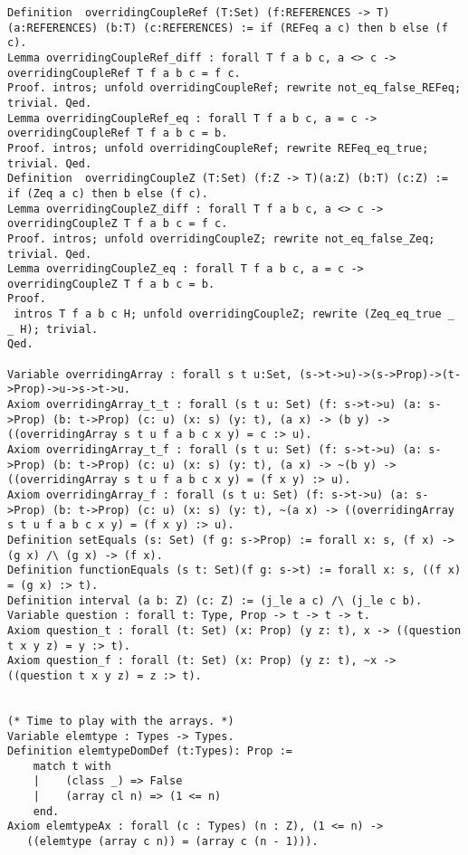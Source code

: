\begin{verbatim}
Definition  overridingCoupleRef (T:Set) (f:REFERENCES -> T)(a:REFERENCES) (b:T) (c:REFERENCES) := if (REFeq a c) then b else (f c).
Lemma overridingCoupleRef_diff : forall T f a b c, a <> c -> overridingCoupleRef T f a b c = f c.
Proof. intros; unfold overridingCoupleRef; rewrite not_eq_false_REFeq; trivial. Qed.
Lemma overridingCoupleRef_eq : forall T f a b c, a = c -> overridingCoupleRef T f a b c = b.
Proof. intros; unfold overridingCoupleRef; rewrite REFeq_eq_true; trivial. Qed.
Definition  overridingCoupleZ (T:Set) (f:Z -> T)(a:Z) (b:T) (c:Z) := if (Zeq a c) then b else (f c).
Lemma overridingCoupleZ_diff : forall T f a b c, a <> c -> overridingCoupleZ T f a b c = f c.
Proof. intros; unfold overridingCoupleZ; rewrite not_eq_false_Zeq; trivial. Qed.
Lemma overridingCoupleZ_eq : forall T f a b c, a = c -> overridingCoupleZ T f a b c = b. 
Proof.
 intros T f a b c H; unfold overridingCoupleZ; rewrite (Zeq_eq_true _ _ H); trivial.
Qed.

Variable overridingArray : forall s t u:Set, (s->t->u)->(s->Prop)->(t->Prop)->u->s->t->u.
Axiom overridingArray_t_t : forall (s t u: Set) (f: s->t->u) (a: s->Prop) (b: t->Prop) (c: u) (x: s) (y: t), (a x) -> (b y) -> ((overridingArray s t u f a b c x y) = c :> u).
Axiom overridingArray_t_f : forall (s t u: Set) (f: s->t->u) (a: s->Prop) (b: t->Prop) (c: u) (x: s) (y: t), (a x) -> ~(b y) -> ((overridingArray s t u f a b c x y) = (f x y) :> u).
Axiom overridingArray_f : forall (s t u: Set) (f: s->t->u) (a: s->Prop) (b: t->Prop) (c: u) (x: s) (y: t), ~(a x) -> ((overridingArray s t u f a b c x y) = (f x y) :> u).
Definition setEquals (s: Set) (f g: s->Prop) := forall x: s, (f x) -> (g x) /\ (g x) -> (f x).
Definition functionEquals (s t: Set)(f g: s->t) := forall x: s, ((f x) = (g x) :> t).
Definition interval (a b: Z) (c: Z) := (j_le a c) /\ (j_le c b).
Variable question : forall t: Type, Prop -> t -> t -> t.
Axiom question_t : forall (t: Set) (x: Prop) (y z: t), x -> ((question t x y z) = y :> t).
Axiom question_f : forall (t: Set) (x: Prop) (y z: t), ~x -> ((question t x y z) = z :> t).


(* Time to play with the arrays. *)
Variable elemtype : Types -> Types.
Definition elemtypeDomDef (t:Types): Prop :=
    match t with
    |    (class _) => False 
    |    (array cl n) => (1 <= n)
    end.
Axiom elemtypeAx : forall (c : Types) (n : Z), (1 <= n) -> 
   ((elemtype (array c n)) = (array c (n - 1))).


\end{verbatim}
